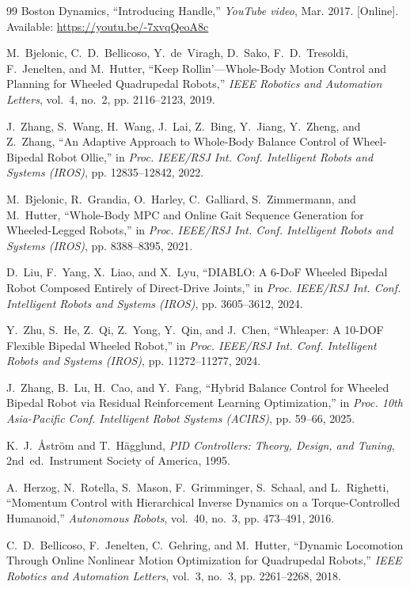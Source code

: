 \documentclass[conference]{IEEEtran}
\begin{document}
\begin{thebibliography}{99}
Boston Dynamics,
``Introducing Handle,''
\emph{YouTube video}, Mar. 2017. [Online]. Available: \url{https://youtu.be/-7xvqQeoA8c}

M.~Bjelonic, C.~D.~Bellicoso, Y.~de~Viragh, D.~Sako, F.~D.~Tresoldi, F.~Jenelten, and M.~Hutter,
``Keep Rollin'---Whole-Body Motion Control and Planning for Wheeled Quadrupedal Robots,''
\emph{IEEE Robotics and Automation Letters}, vol.~4, no.~2, pp. 2116--2123, 2019.

J.~Zhang, S.~Wang, H.~Wang, J.~Lai, Z.~Bing, Y.~Jiang, Y.~Zheng, and Z.~Zhang,
``An Adaptive Approach to Whole-Body Balance Control of Wheel-Bipedal Robot Ollie,''
in \emph{Proc. IEEE/RSJ Int. Conf. Intelligent Robots and Systems (IROS)}, pp. 12835--12842, 2022.

M.~Bjelonic, R.~Grandia, O.~Harley, C.~Galliard, S.~Zimmermann, and M.~Hutter,
``Whole-Body MPC and Online Gait Sequence Generation for Wheeled-Legged Robots,''
in \emph{Proc. IEEE/RSJ Int. Conf. Intelligent Robots and Systems (IROS)}, pp. 8388--8395, 2021.

D.~Liu, F.~Yang, X.~Liao, and X.~Lyu,
``DIABLO: A 6-DoF Wheeled Bipedal Robot Composed Entirely of Direct-Drive Joints,''
in \emph{Proc. IEEE/RSJ Int. Conf. Intelligent Robots and Systems (IROS)}, pp. 3605--3612, 2024.

Y.~Zhu, S.~He, Z.~Qi, Z.~Yong, Y.~Qin, and J.~Chen,
``Whleaper: A 10-DOF Flexible Bipedal Wheeled Robot,''
in \emph{Proc. IEEE/RSJ Int. Conf. Intelligent Robots and Systems (IROS)}, pp. 11272--11277, 2024.

J.~Zhang, B.~Lu, H.~Cao, and Y.~Fang,
``Hybrid Balance Control for Wheeled Bipedal Robot via Residual Reinforcement Learning Optimization,''
in \emph{Proc. 10th Asia-Pacific Conf. Intelligent Robot Systems (ACIRS)}, pp. 59--66, 2025.

K.~J.~\AA{}str\"{o}m and T.~H\"{a}gglund,
\emph{PID Controllers: Theory, Design, and Tuning}, 2nd~ed.\ Instrument Society of America, 1995.

A.~Herzog, N.~Rotella, S.~Mason, F.~Grimminger, S.~Schaal, and L.~Righetti,
``Momentum Control with Hierarchical Inverse Dynamics on a Torque-Controlled Humanoid,''
\emph{Autonomous Robots}, vol.~40, no.~3, pp. 473--491, 2016.

C.~D.~Bellicoso, F.~Jenelten, C.~Gehring, and M.~Hutter,
``Dynamic Locomotion Through Online Nonlinear Motion Optimization for Quadrupedal Robots,''
\emph{IEEE Robotics and Automation Letters}, vol.~3, no.~3, pp. 2261--2268, 2018.


\end{thebibliography}
\end{document}
